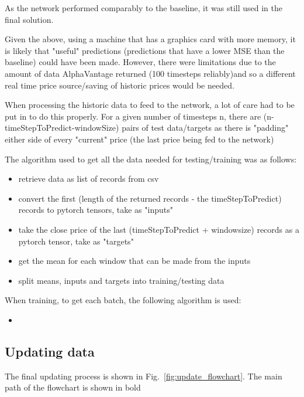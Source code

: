         As the network performed comparably to the baseline, it was still used in the final solution.

        Given the above, using a machine that has a graphics card with more memory, it is likely that "useful" predictions (predictions that have a lower MSE than the baseline) could have been made. However, there were limitations due to the amount of data AlphaVantage returned (100 timesteps reliably)and so a different real time price source/saving of historic prices would be needed.

        When processing the historic data to feed to the network, a lot of care had to be put in to do this properly. For a given number of timesteps n, there are (n-timeStepToPredict-windowSize) pairs of test data/targets as there is "padding" either side of every "current" price (the last price being fed to the network)

        The algorithm used to get all the data needed for testing/training was as follows: 
        
        \begin{itemize}
            \item retrieve data as list of records from csv
            \item convert the first (length of the returned records - the timeStepToPredict) records to pytorch tensors, take as "inputs"
            \item take the close price of the last (timeStepToPredict + windowsize) records as a pytorch tensor, take as "targets"
            \item get the mean for each window that can be made from the inputs
            \item split means, inputs and targets into training/testing data
        \end{itemize}

        When training, to get each batch, the following algorithm is used:

        \begin{itemize}
            \item 
        \end{itemize}

        \subsection{Updating data}

            The final updating process is shown in Fig.~\ref{fig:update_flowchart}. The main path of the flowchart is shown in bold
            
